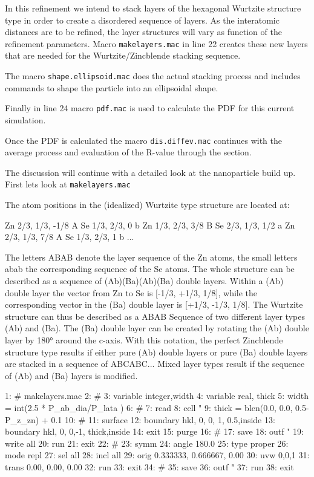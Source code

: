 In this refinement we intend to stack layers of the hexagonal Wurtzite structure
type in order to create a disordered sequence of layers. As the interatomic
distances are to be refined, the layer structures will vary as function of the
refinement parameters. Macro {\tt makelayers.mac} in line 22 creates  these new
layers that are needed for the Wurtzite/Zincblende stacking sequence.

The macro {\tt shape.ellipsoid.mac} does the actual stacking process and includes
commands to shape the particle into an ellipsoidal shape.

Finally in line 24 macro {\tt pdf.mac} is used to calculate the PDF for this 
current simulation.

Once the PDF is calculated the macro {\tt dis.diffev.mac} continues with the average
process and evaluation of the R-value through the \Kuplot section.

The discussion will continue with a detailed look at the nanoparticle build up.
First lets look at {\tt makelayers.mac}

The atom positions in the (idealized) Wurtzite type structure are located at:
\begin{MacVerbatim}
   Zn  2/3,  1/3, -1/8     A
   Se  1/3,  2/3,  0       b
   Zn  1/3,  2/3,  3/8     B
   Se  2/3,  1/3,  1/2     a
   Zn  2/3,  1/3,  7/8     A
   Se  1/3,  2/3,  1       b
   ...
\end{MacVerbatim}

The letters ABAB denote the layer sequence of the Zn atoms, the small letters
abab the corresponding sequence of the Se atoms. The whole structure can be 
described as a sequence of (Ab)(Ba)(Ab)(Ba) double layers. Within a (Ab)
double layer the vector from Zn to Se is [-1/3, +1/3, 1/8], while the
corresponding vector in the (Ba) double layer is [+1/3, -1/3, 1/8]. The
Wurtzite structure can thus be described as a ABAB Sequence of two different 
layer types (Ab) and (Ba). The (Ba) double layer can be created by rotating 
the (Ab) double layer by 180° around the c-axis. With this notation, the
perfect Zincblende structure type results if either pure (Ab) double layers 
or pure (Ba) double layers are stacked in a sequence of ABCABC...
Mixed layer types result if the sequence of (Ab) and (Ba) layers is modified.
\begin{MacVerbatim}
 1: # makelayers.mac
 2: #
 3: variable integer,width
 4: variable real, thick
 5: width = int(2.5 * P_ab_dia/P_lata )
 6: #
 7: read
 8:    cell "%
 9: thick = blen(0.0, 0.0, 0.5-P_z_zn) + 0.1
10: #
11: surface
12:    boundary hkl, 0, 0, 1,   0.5,inside
13:    boundary hkl, 0, 0,-1, thick,inside
14: exit
15: purge
16: #
17: save
18:    outf "%
19:    write all
20:    run
21: exit
22: #
23: symm
24:    angle 180.0
25:    type  proper
26:    mode  repl
27:    sel   all
28:    incl  all
29:    orig  0.333333, 0.666667, 0.00
30:    uvw   0,0,1
31:    trans 0.00, 0.00, 0.00
32:    run
33: exit
34: #
35: save
36:    outf "%
37:    run
38: exit
\end{MacVerbatim}

